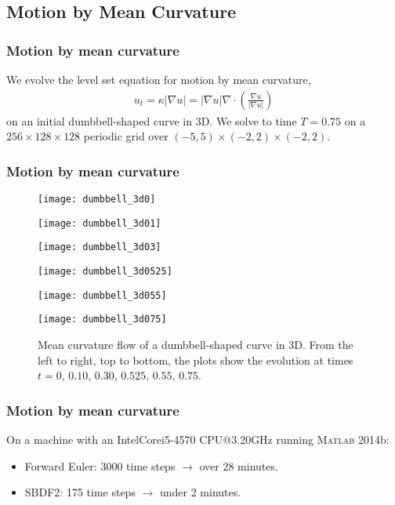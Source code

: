 \documentclass[hyperref={pdfpagelabels=false}]{beamer}
\begin{document}
\subsection{Motion by Mean Curvature}
\begin{frame}
	\frametitle{Motion by mean curvature}
We evolve the level set equation for motion by mean curvature, 
\begin{align*}
u_t 
= \kappa \left\vert \nabla u \right\vert 
= \left\vert \nabla u \right\vert \nabla \cdot \left(\frac{\nabla u}{\left\vert \nabla u \right\vert} 
\right)
\end{align*}
on an initial dumbbell-shaped curve in 3D. We solve to time $T=0.75$ on a $256\times 128\times 128$ periodic grid over $(-5,5) \times (-2,2) \times (-2,2)$.
\end{frame}
\begin{frame}
	\frametitle{Motion by mean curvature} 
\begin{figure}[htb!]
        \centering
\begin{minipage}{0.30\textwidth}
        \texttt{[image: dumbbell\_3d0]}
\end{minipage}%
\begin{minipage}{0.30\textwidth}
        \texttt{[image: dumbbell\_3d01]}
\end{minipage}%
\begin{minipage}{0.30\textwidth}
        \texttt{[image: dumbbell\_3d03]}
\end{minipage}
\begin{minipage}{0.30\textwidth}
        \texttt{[image: dumbbell\_3d0525]}
\end{minipage}%
\begin{minipage}{0.30\textwidth}
        \texttt{[image: dumbbell\_3d055]}
\end{minipage}%
\begin{minipage}{0.30\textwidth}
        \texttt{[image: dumbbell\_3d075]}
\end{minipage}
\caption[Mean curvature flow of a dumbbell-shaped curve in 3D]{Mean curvature flow of a dumbbell-shaped curve in 3D. From the left to right, top to bottom, the plots show the evolution at times $t=0$, $0.10$, $0.30$, $0.525$, $0.55$, $0.75$.}
\end{figure}
\end{frame}
\begin{frame}
        \frametitle{Motion by mean curvature}
On a machine with an Intel\textsuperscript{\textregistered}Core\textsuperscript{\texttrademark}i5-4570 CPU@3.20GHz running \textsc{Matlab} 2014b: 
\begin{itemize}
	\item Forward Euler: 3000 time steps $\to$ over 28 minutes.
	
	\item SBDF2: 175 time steps $\to$ under 2 minutes.
\end{itemize}
\end{frame}
\end{document}
